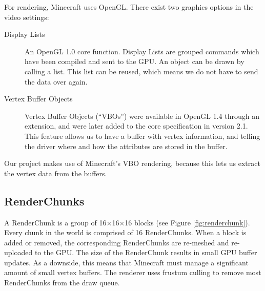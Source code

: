 \documentclass[]{article}
\begin{document}
For rendering, Minecraft uses OpenGL.
There exist two graphics options in the video settings:
\begin{description}
  \item[Display Lists] An OpenGL 1.0 core function.
    Display Lists are grouped commands which have been compiled and sent to the GPU.
    An object can be drawn by calling a list.
    This list can be reused, which means we do not have to send the data over again.
  \item[Vertex Buffer Objects] Vertex Buffer Objects (\enquote{VBOs}) were available in OpenGL 1.4 through an extension, and were later added to the core specification in version 2.1.
    This feature allows us to have a buffer with vertex information, and telling the driver where and how the attributes are stored in the buffer.
\end{description}
Our project makes use of Minecraft's VBO rendering, because this lets us extract the vertex data from the buffers.

\subsection{RenderChunks}
A RenderChunk is a group of 16$\times$16$\times$16 blocks (see Figure \ref{fig:renderchunk}).
Every chunk in the world is comprised of 16 RenderChunks.
When a block is added or removed, the corresponding RenderChunks are re-meshed and re-uploaded to the GPU.
The size of the RenderChunk results in small GPU buffer updates.
As a downside, this means that Minecraft must manage a significant amount of small vertex buffers.
The renderer uses frustum culling to remove most RenderChunks from the draw queue.
\end{document}
